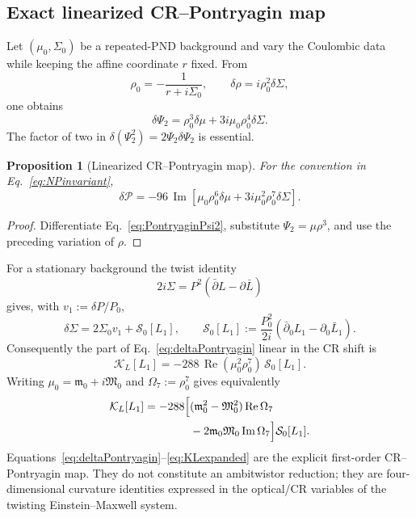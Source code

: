 \documentclass[aps,prd,reprint,nofootinbib,superscriptaddress]{revtex4-2}
\newtheorem{proposition}[theorem]{Proposition}
\theoremstyle{definition}
\theoremstyle{remark}
\begin{document}
\subsection{Exact linearized CR--Pontryagin map}

Let $(\mu_0,\Sigma_0)$ be a repeated-PND background and vary the Coulombic data while keeping the affine coordinate $r$ fixed. From
\begin{equation}
 \rho_0=-\frac{1}{r+i\Sigma_0},
 \qquad
 \delta\rho=i\rho_0^2\delta\Sigma,
\end{equation}
one obtains
\begin{equation}
 \delta\Psi_2
 =\rho_0^3\delta\mu
 +3i\mu_0\rho_0^4\delta\Sigma.
\end{equation}
The factor of two in $\delta(\Psi_2^2)=2\Psi_2\delta\Psi_2$ is essential.
\begin{proposition}[Linearized CR--Pontryagin map]
\label{prop:CRPontryaginMap}
For the convention in Eq.~\eqref{eq:NPinvariant},
\begin{equation}
 \boxed{
 \delta\mathcal P
 =-96\,\operatorname{Im}\!\left[
 \mu_0\rho_0^6\delta\mu
 +3i\mu_0^2\rho_0^7\delta\Sigma
 \right].}
 \label{eq:deltaPontryagin}
\end{equation}
\end{proposition}
\begin{proof}
Differentiate Eq.~\eqref{eq:PontryaginPsi2}, substitute $\Psi_2=\mu\rho^3$, and use the preceding variation of $\rho$.
\end{proof}

For a stationary background the twist identity
\begin{equation}
 2i\Sigma=P^2(\bar\partial L-\partial\bar L)
 \label{eq:twistCRidentity}
\end{equation}
gives, with $v_1:=\delta P/P_0$,
\begin{equation}
 \delta\Sigma
 =2\Sigma_0 v_1+\mathcal S_0[L_1],
 \qquad
 \mathcal S_0[L_1]
 :=\frac{P_0^2}{2i}
 (\bar\partial_0L_1-\partial_0\bar L_1).
 \label{eq:deltaSigmaCR}
\end{equation}
Consequently the part of Eq.~\eqref{eq:deltaPontryagin} linear in the CR shift is
\begin{equation}
 \boxed{
 \mathcal K_L[L_1]
 =-288\,\operatorname{Re}(\mu_0^2\rho_0^7)\,
 \mathcal S_0[L_1].}
 \label{eq:KLcompact}
\end{equation}
Writing $\mu_0=\mathfrak m_0+i\mathfrak M_0$ and $\Omega_7:=\rho_0^7$ gives equivalently
\begin{align}
 \mathcal K_L[L_1]
 =-288\Bigl[&
 (\mathfrak m_0^2-\mathfrak M_0^2)\operatorname{Re}\Omega_7
 \nonumber\\
 &-2\mathfrak m_0\mathfrak M_0\operatorname{Im}\Omega_7
 \Bigr]\mathcal S_0[L_1].
 \label{eq:KLexpanded}
\end{align}
Equations~\eqref{eq:deltaPontryagin}--\eqref{eq:KLexpanded} are the explicit first-order CR--Pontryagin map. They do not constitute an ambitwistor reduction; they are four-dimensional curvature identities expressed in the optical/CR variables of the twisting Einstein--Maxwell system.
\end{document}
